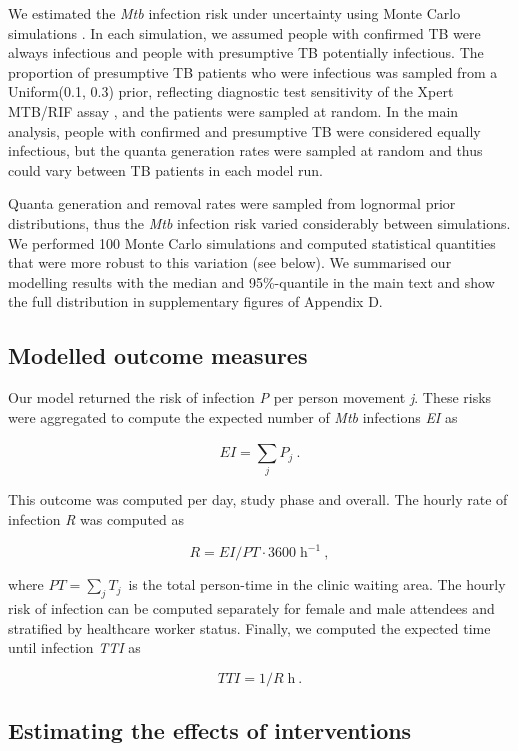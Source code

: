 \documentclass[11pt]{article}
\begin{document}
We estimated the \emph{Mtb} infection risk under uncertainty using Monte Carlo simulations \cite{banholzer2025PLOSComputBiol,banholzer2024PLOSGlobalPublicHealth}. In each simulation, we assumed people with confirmed TB were always infectious and people with presumptive TB potentially infectious. The proportion of presumptive TB patients who were infectious was sampled from a Uniform(0.1, 0.3) prior, reflecting diagnostic test sensitivity of the Xpert MTB/RIF assay \cite{dorman2018LancetInfectDis}, and the patients were sampled at random. In the main analysis, people with confirmed and presumptive TB were considered equally infectious, but the quanta generation rates were sampled at random and thus could vary between TB patients in each model run.

Quanta generation and removal rates were sampled from lognormal prior distributions, thus the \emph{Mtb} infection risk varied considerably between simulations. We performed 100 Monte Carlo simulations and computed statistical quantities that were more robust to this variation (see below). We summarised our modelling results with the median and 95\%-quantile in the main text and show the full distribution in supplementary figures of Appendix D.

\subsection{Modelled outcome measures}\label{modelled-outcome-measures}

Our model returned the risk of infection \emph{P} per person movement \emph{j}. These risks were aggregated to compute the expected number of \emph{Mtb} infections \emph{EI} as

\[EI = \sum_{j}^{}P_{j}~.\]

This outcome was computed per day, study phase and overall. The hourly rate of infection \emph{R} was computed as

\[R = EI/PT \cdot 3600 \; \text{h}^{-1}~,\]

where \(PT = \sum_{j}^{}{}T_{j\ }\) is the total person-time in the clinic waiting area. The hourly risk of infection can be computed separately for female and male attendees and stratified by healthcare worker status. Finally, we computed the expected time until infection \emph{TTI} as

\[TTI = 1/R \; \text{h}~.\]

\subsection{Estimating the effects of interventions}\label{estimating-the-effects-of-interventions}
\end{document}

